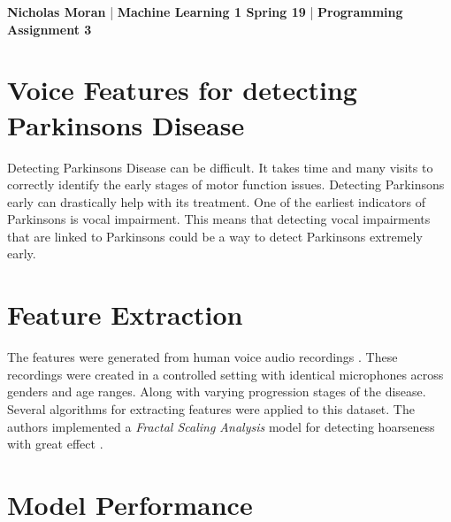 \setlength{\parindent}{10ex}

\textbf{Nicholas Moran} |
\textbf{Machine Learning 1 Spring 19} |
\textbf{Programming Assignment 3} 

\section{Voice Features for detecting Parkinsons Disease}
    Detecting Parkinsons Disease can be difficult. 
    It takes time and many visits to correctly identify the early stages of motor function issues.
    Detecting Parkinsons early can drastically help with its treatment.
    One of the earliest indicators of Parkinsons is vocal impairment.
    This means that detecting vocal impairments that are linked to Parkinsons could be a way to detect Parkinsons extremely early.


\section{Feature Extraction}
    The features were generated from human voice audio recordings \cite{little}.
    These recordings were created in a controlled setting with identical microphones across genders and age ranges.
    Along with varying progression stages of the disease. 
    Several algorithms for extracting features were applied to this dataset.
    The authors implemented a \textit{Fractal Scaling Analysis} model for detecting hoarseness with great effect \cite{McSharry}.




\section{Model Performance}

